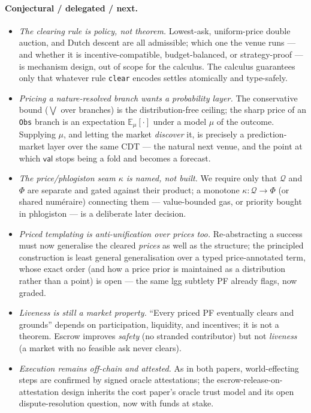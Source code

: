 \documentclass[11pt]{article}
\theoremstyle{definition}
\newcommand{\PF}{\textsf{PF}}
\newcommand{\CDT}{\textsf{CDT}}
\newcommand{\val}{\ensuremath{\mathsf{val}}}
\newcommand{\Qval}{\mathcal{Q}}            %
\newcommand{\Phl}{\Phi}                     %
\begin{document}
\paragraph{Conjectural / delegated / next.}
\begin{itemize}[leftmargin=1.4em]
\item \emph{The clearing rule is policy, not theorem.} Lowest-ask, uniform-price double auction, and
Dutch descent are all admissible; which one the venue runs --- and whether it is
incentive-compatible, budget-balanced, or strategy-proof --- is mechanism design, out of scope for
the calculus. The calculus guarantees only that whatever rule \texttt{clear} encodes settles
atomically and type-safely.
\item \emph{Pricing a nature-resolved branch wants a probability layer.} The conservative bound
($\bigvee$ over branches) is the distribution-free ceiling; the sharp price of an \texttt{Obs} branch
is an expectation $\mathbb{E}_\mu[\cdot]$ under a model $\mu$ of the outcome. Supplying $\mu$, and
letting the market \emph{discover} it, is precisely a prediction-market layer over the same \CDT{} ---
the natural next venue, and the point at which $\val$ stops being a fold and becomes a forecast.
\item \emph{The price/phlogiston seam $\kappa$ is named, not built.} We require only that $\Qval$ and
$\Phl$ are separate and gated against their product; a monotone $\kappa:\Qval\to\Phl$ (or shared
num\'eraire) connecting them --- value-bounded gas, or priority bought in phlogiston --- is a
deliberate later decision.
\item \emph{Priced templating is anti-unification over prices too.} Re-abstracting a success must now
generalise the cleared \emph{prices} as well as the structure; the principled construction is least
general generalisation over a typed price-annotated term, whose exact order (and how a price prior is
maintained as a distribution rather than a point) is open --- the same lgg subtlety \PF{} already
flags, now graded.
\item \emph{Liveness is still a market property.} ``Every priced \PF{} eventually clears and grounds''
depends on participation, liquidity, and incentives; it is not a theorem. Escrow improves \emph{safety}
(no stranded contributor) but not \emph{liveness} (a market with no feasible ask never clears).
\item \emph{Execution remains off-chain and attested.} As in both papers, world-effecting steps are
confirmed by signed oracle attestations; the escrow-release-on-attestation design inherits the cost
paper's oracle trust model and its open dispute-resolution question, now with funds at stake.
\end{itemize}
\end{document}
